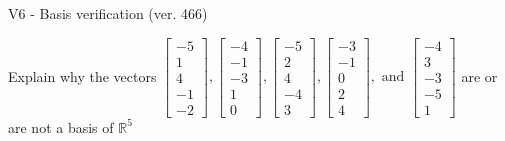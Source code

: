 \begin{exercise}
  \begin{exerciseTitle}V6 - Basis verification (ver. 466)\end{exerciseTitle}
  \begin{exerciseStatement}
    Explain why the vectors \(\left[\begin{array}{r}
-5 \\
1 \\
4 \\
-1 \\
-2
\end{array}\right] , \left[\begin{array}{r}
-4 \\
-1 \\
-3 \\
1 \\
0
\end{array}\right] , \left[\begin{array}{r}
-5 \\
2 \\
4 \\
-4 \\
3
\end{array}\right] , \left[\begin{array}{r}
-3 \\
-1 \\
0 \\
2 \\
4
\end{array}\right] , \text{ and } \left[\begin{array}{r}
-4 \\
3 \\
-3 \\
-5 \\
1
\end{array}\right]\) are or are not a basis of \(\mathbb{R}^5\)	



\end{exerciseStatement}
\end{exercise}
